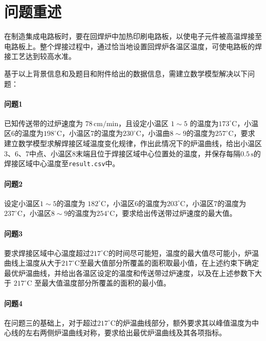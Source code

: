 \documentclass[../main.tex]{subfiles}
\begin{document}
\section{问题重述}
在制造集成电路板时，要在回焊炉中加热印刷电路板，以使电子元件被高温焊接至电路板上。整个焊接过程中，通过恰当地设置回焊炉各温区温度，可使电路板的焊接工艺达到较高水准。

基于以上背景信息和及题目和附件给出的数据信息，需建立数学模型解决以下问题：

\paragraph{问题1}
已知传送带的过炉速度为 \(78\,\mathrm{cm}/\mathrm{min}\)，且设定小温区 \(1{\sim}5\) 的温度为\(173^{\circ} \mathrm{C}\)，小温区6的温度为\(198^{\circ}\mathrm{C}\)，小温区7的温度为\(230^{\circ}\mathrm{C}\)，小温曲\(8{ \sim }9\)的温度为\(257^{\circ}\mathrm{C}\)，要求建立数学模型求解焊接区域温度变化规律，作出此情况下的炉温曲线，给出小温区3、6、7中点、小温区8末端且位于焊接区域中心位置处的温度，并保存每隔\(0.5\, \mathrm{s}\)的焊接区域中心温度至\texttt{result.csv}中。

\paragraph{问题2}
设定小温区\(1{\sim}5\)的温度为 \(182^{\circ}\mathrm{C}\)，小温区6的温度为\(203^{\circ}\mathrm{C}\)，小温区7的温度为\(237^{\circ}\mathrm{C}\)，小温区\(8{\sim}9\)的温度为\(254^{\circ}\mathrm{C}\)，要求给出传送带过炉速度的最大值。

\paragraph{问题3}
要求焊接区域中心温度超过\(217^{\circ}\mathrm{C}\)的时间尽可能短，温度的最大值尽可能小，炉温曲线上温度从大于\(217^{\circ}\mathrm{C}\)至最大值部分所覆盖的面积取最小值，在上述约束下确定最优炉温曲线，并给出各温区设定的温度和传送带过炉速度，以及在上述参数下大于 \(217 ^{\circ}\mathrm{C}\) 至最大值温度部分所覆盖的面积的最小值。

\paragraph{问题4}
在问题三的基础上，对于超过\(217 ^{\circ}\mathrm{C}\)的炉温曲线部分，额外要求其以峰值温度为中心线的左右两侧炉温曲线对称，要求给出最优炉温曲线及其各项指标。
\end{document}
